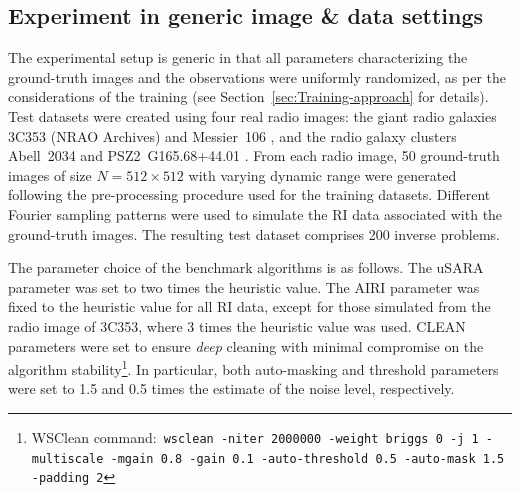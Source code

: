 \documentclass[preprint2,twocolumn]{aastex631}
\begin{document}
\subsection {Experiment in generic image \& data settings}
\label{subsec:Experiment-generic-settings}

The experimental setup is generic in that all parameters characterizing the ground-truth images and the observations were uniformly randomized, as per the considerations of the training (see Section~\ref{sec:Training-approach} for details).
Test datasets were created using four real radio images: the giant radio galaxies 3C353 (NRAO Archives) and Messier~106 \citep{shimwell2022}, and the radio galaxy clusters {Abell~2034} and PSZ2~G165.68+44.01 \citep{botteon2022}. 
From each radio image, 50 ground-truth images of size $N =512 \times 512$ with varying dynamic range were generated following the pre-processing procedure used for the training datasets. Different Fourier sampling patterns were used to simulate the RI data associated with the ground-truth images. The resulting test dataset comprises 200 inverse problems.

The parameter choice of the benchmark algorithms is as follows. The uSARA parameter was set to two times the heuristic value. The AIRI parameter was fixed to the heuristic value for all RI data, except for those simulated from the radio image of 3C353, where 3 times the heuristic value was used. CLEAN parameters were set to ensure \textit{deep} cleaning with minimal compromise on the algorithm stability\footnote{WSClean command:~\tt{wsclean -niter 2000000 -weight briggs 0 -j 1 -multiscale -mgain 0.8 -gain 0.1 -auto-threshold 0.5 -auto-mask 1.5 -padding 2}}. In particular, both auto-masking and threshold parameters were set to 1.5 and 0.5 times the estimate of the noise level, respectively. 
\end{document}
